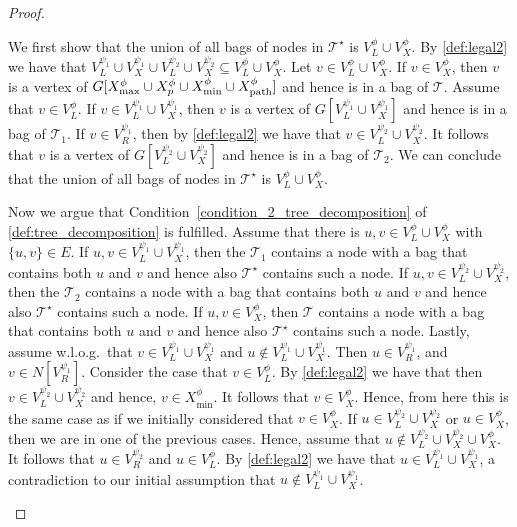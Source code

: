 \documentclass[a4paper,UKenglish,cleveref, autoref, thm-restate, numberwithinsect]{lipics-v2021}
\newcommand{\dpath}{\textup{path}}
\begin{document}
\begin{proof}
\begin{enumerate}
We first show that the union of all bags of nodes in $\mathcal{T}^\star$ is $V^\phi_L\cup V^\phi_X$.
By \cref{def:legal2} we have that $V^{\psi_1}_L\cup V^{\psi_1}_X\cup V^{\psi_2}_L\cup V^{\psi_2}_X\subseteq V^\phi_L\cup V^\phi_X$. Let $v\in V^\phi_L\cup V^\phi_X$. If $v\in V^\phi_X$, then $v$ is a vertex of $G[X^\phi_{\max}\cup X^\phi_p\cup X^\phi_{\min}\cup X^\phi_{\dpath}]$ and hence is in a bag of $\mathcal{T}$. 
Assume that $v\in V^\phi_L$.
If $v\in V^{\psi_1}_L\cup V^{\psi_1}_X$, then $v$ is a vertex of $G[V^{\psi_1}_L\cup V^{\psi_1}_X]$ and hence is in a bag of $\mathcal{T}_1$.
If $v\in V^{\psi_1}_R$, then by \cref{def:legal2} we have that $v\in V^{\psi_2}_L\cup V^{\psi_2}_X$. It follows that $v$ is a vertex of $G[V^{\psi_2}_L\cup V^{\psi_2}_X]$ and hence is in a bag of $\mathcal{T}_2$.
We can conclude that the union of all bags of nodes in $\mathcal{T}^\star$ is $V^\phi_L\cup V^\phi_X$.

Now we argue that Condition~\ref{condition_2_tree_decomposition} of \cref{def:tree_decomposition} is fulfilled. Assume that there is $u,v\in V^\phi_L\cup V^\phi_X$ with $\{u,v\}\in E$. If $u,v\in V^{\psi_1}_L\cup V^{\psi_1}_X$, then the $\mathcal{T}_1$ contains a node with a bag that contains both $u$ and $v$ and hence also $\mathcal{T}^\star$ contains such a node. If $u,v\in V^{\psi_2}_L\cup V^{\psi_2}_X$, then the $\mathcal{T}_2$ contains a node with a bag that contains both $u$ and $v$ and hence also $\mathcal{T}^\star$ contains such a node.
If $u,v\in V^\phi_X$, then $\mathcal{T}$ contains a node with a bag that contains both $u$ and $v$ and hence also $\mathcal{T}^\star$ contains such a node.
Lastly, assume w.l.o.g.\ that $v\in V^{\psi_1}_L\cup V^{\psi_1}_X$ and $u\notin V^{\psi_1}_L\cup V^{\psi_1}_X$.
Then $u\in V^{\psi_1}_R$, and $v\in N[V^{\psi_1}_R]$. 
Consider the case that $v\in V^\phi_L$.
By \cref{def:legal2} we have that then $v\in V^{\psi_2}_L\cup V^{\psi_2}_X$ and hence, $v\in X^\phi_{\text{min}}$. It follows that $v\in V^\phi_X$. Hence, from here this is the same case as if we initially considered that $v\in V^\phi_X$.
If $u\in V^{\psi_2}_L\cup V^{\psi_2}_X$ or $u\in V^\phi_X$, then we are in one of the previous cases. Hence, assume that $u\notin V^{\psi_2}_L\cup V^{\psi_2}_X\cup V^\phi_X$.
It follows that $u\in V^{\psi_2}_R$ and $u\in V^\phi_L$. 
By \cref{def:legal2} we have that $u\in V^{\psi_1}_L\cup V^{\psi_1}_X$, a contradiction to our initial assumption that $u\notin V^{\psi_1}_L\cup V^{\psi_1}_X$.






\end{enumerate}
\end{proof}
\end{document}
